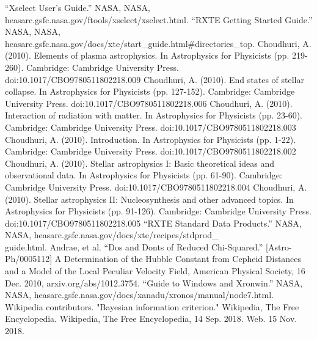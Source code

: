 \documentclass[a4paper,twoside]{report}
\numberwithin{equation}{section}
\begin{document}
\begin{thebibliography}{20}
“Xselect User's Guide.” NASA, NASA, heasarc.gsfc.nasa.gov/ftools/xselect/xselect.html.
“RXTE Getting Started Guide.” NASA, NASA, heasarc.gsfc.nasa.gov/docs/xte/start\_guide.html\#directories\_top.
Choudhuri, A. (2010). Elements of plasma astrophysics. In Astrophysics for Physicists (pp. 219-260). Cambridge: Cambridge University Press. doi:10.1017/CBO9780511802218.009
Choudhuri, A. (2010). End states of stellar collapse. In Astrophysics for Physicists (pp. 127-152). Cambridge: Cambridge University Press. doi:10.1017/CBO9780511802218.006
Choudhuri, A. (2010). Interaction of radiation with matter. In Astrophysics for Physicists (pp. 23-60). Cambridge: Cambridge University Press. doi:10.1017/CBO9780511802218.003
Choudhuri, A. (2010). Introduction. In Astrophysics for Physicists (pp. 1-22). Cambridge: Cambridge University Press. doi:10.1017/CBO9780511802218.002
Choudhuri, A. (2010). Stellar astrophysics I: Basic theoretical ideas and observational data. In Astrophysics for Physicists (pp. 61-90). Cambridge: Cambridge University Press. doi:10.1017/CBO9780511802218.004
Choudhuri, A. (2010). Stellar astrophysics II: Nucleosynthesis and other advanced topics. In Astrophysics for Physicists (pp. 91-126). Cambridge: Cambridge University Press. doi:10.1017/CBO9780511802218.005
“RXTE Standard Data Products.” NASA, NASA, heasarc.gsfc.nasa.gov/docs/xte/recipes/stdprod\_ \\ guide.html.
Andrae, et al. “Dos and Donts of Reduced Chi-Squared.” [Astro-Ph/0005112] A Determination of the Hubble Constant from Cepheid Distances and a Model of the Local Peculiar Velocity Field, American Physical Society, 16 Dec. 2010, arxiv.org/abs/1012.3754.
“Guide to Windows and Xronwin.” NASA, NASA, heasarc.gsfc.nasa.gov/docs/xanadu/xronos/manual/node7.html.
Wikipedia contributors. "Bayesian information criterion." Wikipedia, The Free Encyclopedia. Wikipedia, The Free Encyclopedia, 14 Sep. 2018. Web. 15 Nov. 2018.


  	

\end{thebibliography}
\end{document}
